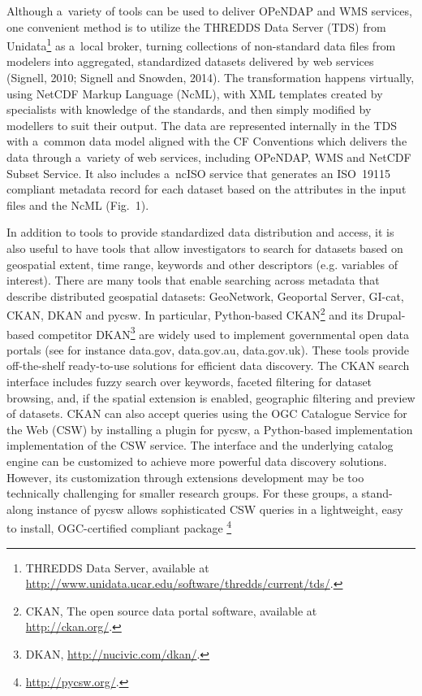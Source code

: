 \documentclass[osd, online, hvmath]{copernicus}
\begin{document}
Although a~variety of tools can be used to deliver OPeNDAP and WMS
services, one convenient method is to utilize the THREDDS Data Server
(TDS) from Unidata\footnote{THREDDS Data Server, available at
  \url{http://www.unidata.ucar.edu/software/thredds/current/tds/}.} as
a~local broker, turning collections of non-standard data files from
modelers into aggregated, standardized datasets delivered by web
services (Signell, 2010; Signell and Snowden, 2014). The
transformation happens virtually, using NetCDF Markup Language (NcML),
with XML templates created by specialists with knowledge of the standards,
and then simply modified by modellers to suit their output. The data are represented
internally in the TDS with a~common data model aligned with the
CF Conventions which delivers the data through
a~variety of web services, including OPeNDAP, WMS and NetCDF Subset
Service.  It also includes a~ncISO service that generates an ISO~19115
compliant metadata record for each dataset based on the attributes in the
input files and the NcML (Fig.~1). 

In addition to tools to provide standardized data distribution and
access, it is also useful to have tools that allow investigators to
search for datasets based on geospatial extent, time range, keywords and other descriptors 
(e.g. variables of interest).  
There are many tools that enable
searching across metadata that describe distributed geospatial
datasets: GeoNetwork, Geoportal Server, GI-cat, CKAN, DKAN
and pycsw. In particular, Python-based CKAN\footnote{CKAN, The open
  source data portal software, available at \url{http://ckan.org/}.}
and its Drupal-based competitor DKAN\footnote{DKAN,
  \url{http://nucivic.com/dkan/}.} are widely used to implement
governmental open data portals (see for instance data.gov,
data.gov.au, data.gov.uk). These tools 
 provide off-the-shelf
ready-to-use solutions for efficient data discovery. The CKAN search
interface includes fuzzy search over keywords, faceted
filtering for dataset browsing, and, if the spatial extension is
enabled, geographic filtering and preview of datasets.  CKAN can also accept queries
using the OGC Catalogue Service for the Web (CSW) by installing a plugin for pycsw, a Python-based implementation implementation of the CSW service.  The interface and the underlying
catalog engine can be customized to achieve more powerful data
discovery solutions. However, its customization through extensions
development may be too technically challenging for smaller research groups.  For these groups, a stand-along instance of pycsw allows sophisticated CSW queries in a lightweight, easy to install, OGC-certified compliant package \footnote{\url{http://pycsw.org/}.}
\end{document}

